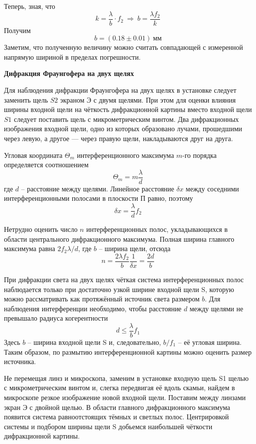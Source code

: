 \documentclass[14pt]{article}
\begin{document}
Теперь, зная, что
$$
	k = \frac{\lambda}{b}\cdot f_2~\Rightarrow~ b = \frac{\lambda f_2}{k}
$$
Получим
$$
	b = (0.18 \pm 0.01)~\text{мм}
$$
Заметим, что полученную величину можно считать совпадающей с измеренной напрямую шириной в пределах погрешности. 

\vspace{1cm}
\textbf{Дифракция Фраунгофера на двух щелях}

Для наблюдения дифракции Фраунгофера на двух щелях в установке следует заменить щель $S2$ экраном Э с двумя щелями. При этом для оценки влияния ширины входной щели на чёткость дифракционной картины вместо входной щели $S1$ следует поставить щель с микрометрическим винтом. Два дифракционных изображения входной щели, одно из которых образовано лучами, прошедшими через левую, а другое — через правую щели, накладываются друг на друга.

Угловая координата $\Theta_m$ интерференционного максимума $m$-го порядка определяется соотношением
$$
	\Theta_m = m\frac{\lambda}{d}
$$
где $d$ -- расстояние между щелями. Линейное расстояние $\delta x$ между соседними интерференционными полосами в плоскости П равно, поэтому
$$
	\delta x = \frac{\lambda}{d}f_2
$$

Нетрудно оценить число $n$ интерференционных полос, укладывающихся в области центрального дифракционного максимума. Полная ширина главного максимума равна $2f_2\lambda/d$, где $b$ -- ширина щели, отсюда
$$
	n = \frac{2\lambda f_2}{b}\frac{1}{\delta x} = \frac{2d}{b}
$$

При дифракции света на двух щелях чёткая система интерференционных полос наблюдается только при достаточно узкой ширине входной щели S, которую можно рассматривать как протяжённый источник света размером $b$. Для наблюдения интерференции необходимо, чтобы расстояние $d$ между щелями не превышало радиуса когерентности
$$
	d \leq \frac{\lambda}{b}f_1
$$
Здесь $b$ -- ширина входной щели S и, следовательно, $b/f_1$ -- её угловая ширина. Таким образом, по размытию интерференционной картины можно оценить размер источника.

Не перемещая линз и микроскопа, заменим в установке входную щель S1 щелью с микрометрическим винтом и, слегка передвигая её вдоль скамьи, найдем в микроскопе резкое изображение новой входной щели. Поставим между линзами экран Э с двойной щелью. В области главного дифракционного максимума появится система равноотстоящих тёмных и светлых полос. Центрировкой системы и подбором ширины щели S добьемся наибольшей чёткости дифракционной картины.
\end{document}
